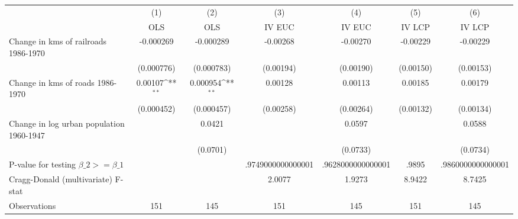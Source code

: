{
\def\sym#1{\ifmmode^{#1}\else\(^{#1}\)\fi}
\begin{tabular}{l*{6}{c}}
\hline\hline
                &\multicolumn{1}{c}{(1)}&\multicolumn{1}{c}{(2)}&\multicolumn{1}{c}{(3)}&\multicolumn{1}{c}{(4)}&\multicolumn{1}{c}{(5)}&\multicolumn{1}{c}{(6)}\\
                &\multicolumn{1}{c}{OLS}&\multicolumn{1}{c}{OLS}&\multicolumn{1}{c}{IV EUC}&\multicolumn{1}{c}{IV EUC}&\multicolumn{1}{c}{IV LCP}&\multicolumn{1}{c}{IV LCP}\\
\hline
Change in kms of railroads 1986-1970&-0.000269         &-0.000289         & -0.00268         & -0.00270         & -0.00229         & -0.00229         \\
                &(0.000776)         &(0.000783)         &(0.00194)         &(0.00190)         &(0.00150)         &(0.00153)         \\
[1em]
Change in kms of roads 1986-1970&  0.00107\sym{**} & 0.000954\sym{**} &  0.00128         &  0.00113         &  0.00185         &  0.00179         \\
                &(0.000452)         &(0.000457)         &(0.00258)         &(0.00264)         &(0.00132)         &(0.00134)         \\
[1em]
Change in log urban population 1960-1947&                  &   0.0421         &                  &   0.0597         &                  &   0.0588         \\
                &                  & (0.0701)         &                  & (0.0733)         &                  & (0.0734)         \\
\hline
P-value for testing $\beta\_{2} >= \beta\_{1}$&                  &                  &.9749000000000001         &.9628000000000001         &    .9895         &.9860000000000001         \\
Cragg-Donald (multivariate) F-stat&                  &                  &   2.0077         &   1.9273         &   8.9422         &   8.7425         \\
Observations    &      151         &      145         &      151         &      145         &      151         &      145         \\
\hline\hline
\end{tabular}
}
